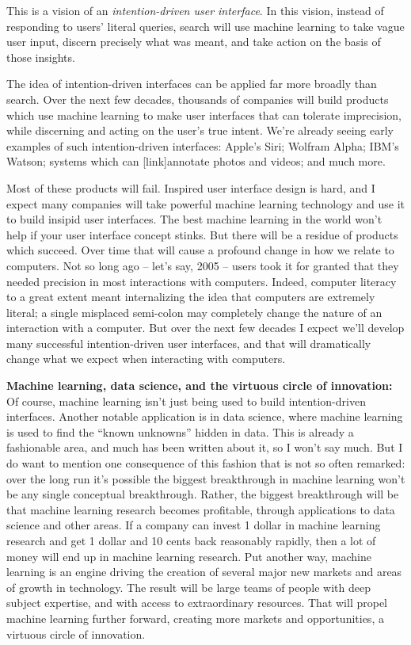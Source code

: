 \documentclass[a4paper,twoside,10pt]{book}
\begin{document}
This is a vision of an \textit{intention-driven user interface}. In this vision, instead of responding to users' literal queries, search will use machine learning to take vague user input, discern precisely what was meant, and take action on the basis of those insights.

The idea of intention-driven interfaces can be applied far more broadly than search. Over the next few decades, thousands of companies will build products which use machine learning to make user interfaces that can tolerate imprecision, while discerning and acting on the user's true intent. We're already seeing early examples of such intention-driven interfaces: Apple's Siri; Wolfram Alpha; IBM's Watson; systems which can [link]annotate photos and videos; and much more.

Most of these products will fail. Inspired user interface design is hard, and I expect many companies will take powerful machine learning technology and use it to build insipid user interfaces. The best machine learning in the world won't help if your user interface concept stinks. But there will be a residue of products which succeed. Over time that will cause a profound change in how we relate to computers. Not so long ago -- let's say, 2005 -- users took it for granted that they needed precision in most interactions with computers. Indeed, computer literacy to a great extent meant internalizing the idea that computers are extremely literal; a single misplaced semi-colon may completely change the nature of an interaction with a computer. But over the next few decades I expect we'll develop many successful intention-driven user interfaces, and that will dramatically change what we expect when interacting with computers.

\textbf{Machine learning, data science, and the virtuous circle of innovation:} Of course, machine learning isn't just being used to build intention-driven interfaces. Another notable application is in data science, where machine learning is used to find the ``known unknowns'' hidden in data. This is already a fashionable area, and much has been written about it, so I won't say much. But I do want to mention one consequence of this fashion that is not so often remarked: over the long run it's possible the biggest breakthrough in machine learning won't be any single conceptual breakthrough. Rather, the biggest breakthrough will be that machine learning research becomes profitable, through applications to data science and other areas. If a company can invest 1 dollar in machine learning research and get 1 dollar and 10 cents back reasonably rapidly, then a lot of money will end up in machine learning research. Put another way, machine learning is an engine driving the creation of several major new markets and areas of growth in technology. The result will be large teams of people with deep subject expertise, and with access to extraordinary resources. That will propel machine learning further forward, creating more markets and opportunities, a virtuous circle of innovation.
\end{document}
